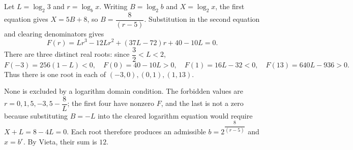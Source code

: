 Let $L=\log_2 3$ and $r=\log_bx$. Writing $B=\log_2b$ and $X=\log_2x$, the first equation gives $X=5B+8$, so $B=\dfrac{8}{(r-5)}$. Substitution in the second equation and clearing denominators gives
\[
F(r)=Lr^3-12Lr^2+(37L-72)r+40-10L=0.
\]
There are three distinct real roots: since $\dfrac{3}{2}<L<2$,
\[
F(-3)=256(1-L)<0,\quad F(0)=40-10L>0,\quad
F(1)=16L-32<0,\quad F(13)=640L-936>0.
\]
Thus there is one root in each of $(-3,0),(0,1),(1,13)$.

None is excluded by a logarithm domain condition. The forbidden values are $r=0,1,5,-3,5-\dfrac{8}{L}$; the first four have nonzero $F$, and the last is not a zero because substituting $B=-L$ into the cleared logarithm equation would require $X+L=8-4L=0$. Each root therefore produces an admissible $b=2^{\dfrac{8}{(r-5)}}$ and $x=b^r$. By Vieta, their sum is $\boxed{12}$.
